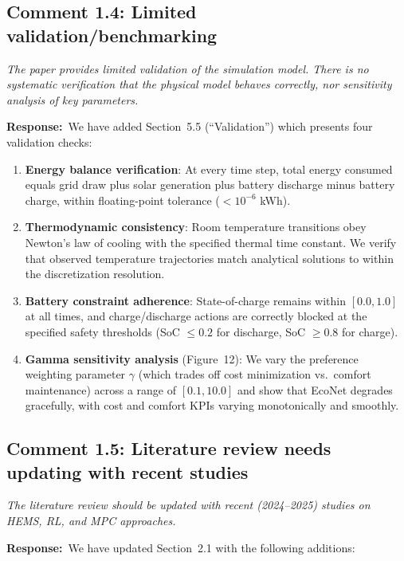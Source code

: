 \documentclass[11pt]{article}
\newcommand{\reviewercomment}[1]{\textit{#1}}
\newcommand{\response}{\textbf{Response:}\ }
\begin{document}
\subsection*{Comment 1.4: Limited validation/benchmarking}

\reviewercomment{The paper provides limited validation of the simulation model. There is no systematic verification that the physical model behaves correctly, nor sensitivity analysis of key parameters.}

\response We have added Section~5.5 (``Validation'') which presents four validation checks:

\begin{enumerate}
    \item \textbf{Energy balance verification}: At every time step, total energy consumed equals grid draw plus solar generation plus battery discharge minus battery charge, within floating-point tolerance ($<10^{-6}$ kWh).
    \item \textbf{Thermodynamic consistency}: Room temperature transitions obey Newton's law of cooling with the specified thermal time constant. We verify that observed temperature trajectories match analytical solutions to within the discretization resolution.
    \item \textbf{Battery constraint adherence}: State-of-charge remains within $[0.0, 1.0]$ at all times, and charge/discharge actions are correctly blocked at the specified safety thresholds (SoC $\leq 0.2$ for discharge, SoC $\geq 0.8$ for charge).
    \item \textbf{Gamma sensitivity analysis} (Figure~12): We vary the preference weighting parameter $\gamma$ (which trades off cost minimization vs.\ comfort maintenance) across a range of $[0.1, 10.0]$ and show that EcoNet degrades gracefully, with cost and comfort KPIs varying monotonically and smoothly.
\end{enumerate}

\subsection*{Comment 1.5: Literature review needs updating with recent studies}

\reviewercomment{The literature review should be updated with recent (2024--2025) studies on HEMS, RL, and MPC approaches.}

\response We have updated Section~2.1 with the following additions:
\end{document}
